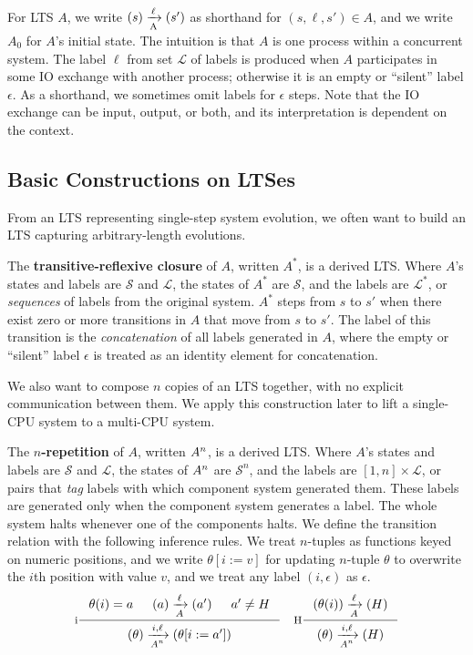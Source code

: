For LTS $A$, we write $\io{A}{s}{s'}{\ell}$ as shorthand for $(s,
\ell, s') \in A$, and we write $A_0$ for $A$'s initial state. The
intuition is that $A$ is one process within a concurrent system. The
label $\ell$ from set $\mathcal L$ of labels is produced when $A$
participates in some IO exchange with another process; otherwise it is
an empty or ``silent'' label $\epsilon$.  As a shorthand, we sometimes
omit labels for $\epsilon$ steps.  Note that the IO exchange can be
input, output, or both, and its interpretation is dependent on the
context.


\subsection{Basic Constructions on LTSes}

From an LTS representing single-step system evolution, we often want to build
an LTS capturing arbitrary-length evolutions.

\begin{defn}
The \textbf{transitive-reflexive closure} of $A$, written $A^{*}$, is a derived
LTS.  Where $A$'s states and labels are $\mathcal S$ and $\mathcal L$, the
states of $A^{*}$ are $\mathcal S$, and the labels are $\mathcal L^{*}$, or
\emph{sequences} of labels from the original system.  $A^{*}$ steps from $s$ to
$s'$ when there exist zero or more transitions in $A$ that move from $s$ to
$s'$.  The label of this transition is the \emph{concatenation} of all labels
generated in $A$, where the empty or ``silent'' label $\epsilon$ is treated as
an identity element for concatenation.
\end{defn}

We also want to compose $n$ copies of an LTS together, with no explicit
communication between them.  We apply this construction later to lift a
single-CPU system to a multi-CPU system.

\begin{defn}
The \textbf{$n$-repetition} of $A$, written $\smulti{n}{A}$, is a derived LTS.
Where $A$'s states and labels are $\mathcal S$ and $\mathcal L$, the states of
$\smulti{n}{A}$ are $\mathcal S^n$, and the labels are $[1, n] \times \mathcal
L$, or pairs that \emph{tag} labels with which component system generated them.
These labels are generated only when the component system generates a label.
The whole system halts whenever one of the components halts.  We define the
transition relation with the following inference rules. We treat $n$-tuples as
functions keyed on numeric positions, and we write $\theta[i := v]$ for
updating $n$-tuple $\theta$ to overwrite the $i$th position with value $v$, and
we treat any label $(i, \epsilon)$ as $\epsilon$.
$$\inference[i]
{\theta(i) = a & \io{$A$}{a}{a'}{\ell} & a' \neq H}
{\io{$\smulti{n}{A}$}{\theta}{\theta[i:=a']}{i,\ell}}
\quad \inference[H]
{\io{$A$}{\theta(i)}{H}{\ell}}
{\io{$\smulti{n}{A}$}{\theta}{H}{i,\ell}}
$$
\end{defn}

